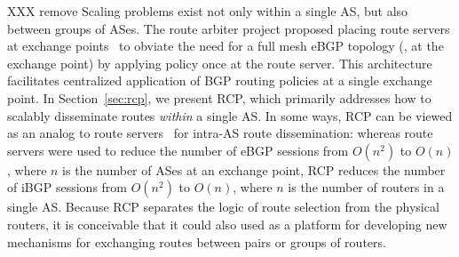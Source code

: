 

XXX remove
Scaling problems exist not only within a single AS, but also between
groups of ASes.  The route arbiter project proposed placing route
servers at exchange points~\cite{Govindan1998} to obviate the need for a
full mesh eBGP topology (\ie, at the exchange point) by applying policy
once at the route server.  This architecture facilitates centralized
application of BGP routing policies at a single exchange point.  In
Section~\ref{sec:rcp}, we present RCP, which primarily addresses how to
scalably disseminate routes {\em within} a single AS.  In some ways, RCP
can be viewed as an analog to route servers~\cite{Govindan1998} for
intra-AS route dissemination: whereas route servers were used to reduce
the number of eBGP sessions from $O(n^2)$ to $O(n)$, where $n$ is the
number of ASes at an exchange point, RCP reduces the number of iBGP
sessions from $O(n^2)$ to $O(n)$, where $n$ is the number of routers in
a single AS.  Because RCP separates the logic of route selection from
the physical routers, it is conceivable that it could also used as a
platform for developing new mechanisms for exchanging routes between
pairs or groups of routers. 
